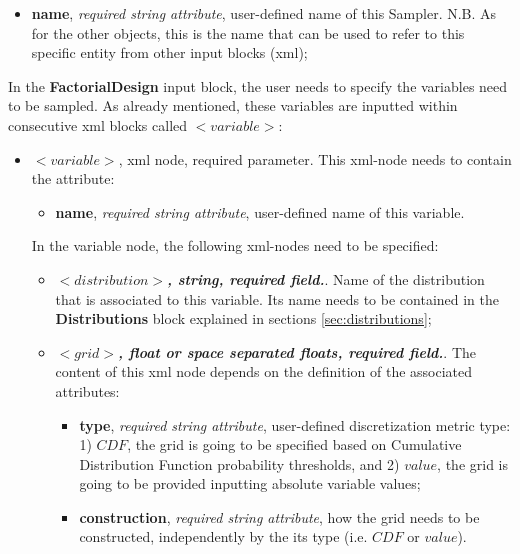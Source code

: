 \begin{itemize}
\itemsep0em
\item \textbf{name}, \textit{required string attribute}, user-defined name of this Sampler. N.B. As for the other objects, this is the name that can be used to refer to this specific entity from other input blocks (xml);
\end{itemize}
In the \textbf{FactorialDesign} input block, the user needs to specify the variables need to be sampled. As already mentioned, these variables are inputted within consecutive xml blocks called $<variable>$:
\begin{itemize}
\item $<variable>$, xml node, required parameter. This xml-node needs to contain the attribute:
\begin{itemize}
  \item \textbf{name}, \textit{required string attribute}, user-defined name of this variable. 
\end{itemize}
 In the variable node, the following xml-nodes need to be specified:
 \begin{itemize}
    \item $<distribution>$\textbf{\textit{, string, required field.}}. Name of the distribution that is associated to this variable. Its name needs to be contained in the \textbf{Distributions} block explained in sections \ref{sec:distributions};
\item $<grid>$\textbf{\textit{, float or space separated floats, required field.}}. The content of this xml node depends on the definition of the associated attributes:
\begin{itemize}
\itemsep0em
\item \textbf{type}, \textit{required string attribute}, user-defined discretization metric type: 1) $CDF$, the grid is going to be specified based on  Cumulative Distribution Function probability thresholds, and 2) $value$, the grid is going to be provided inputting absolute variable values;
\item \textbf{construction}, \textit{required string attribute}, how the grid needs to be constructed, independently by the its type (i.e. $CDF$ or $value$). 
\end{itemize}


\end{itemize}
\end{itemize}
